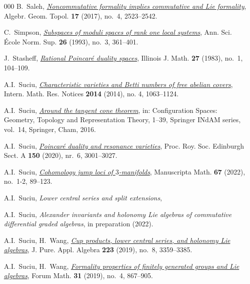 \documentclass{article}
\numberwithin{equation}{section}
\theoremstyle{definition}
\begin{document}
\begin{thebibliography}{000}
 B.~Saleh, 
\href{https://dx.doi.org/10.2140/agt.2017.17.2523}%
{\em Noncommutative formality implies commutative and Lie formality}, 
Algebr. Geom. Topol. \textbf{17} (2017), no.~4, 2523--2542. 

  C.~Simpson, 
\href{https://dx.doi.org/https://doi.org/10.24033/asens.1675}%
{\em Subspaces of moduli spaces of rank one local systems}, 
Ann. Sci. \'{E}cole Norm. Sup. \textbf{26} (1993), no.~3, 361--401.

 J.~Stasheff, 
\href{https://dx.doi.org/10.1215/ijm/1256065414}%
{\em Rational Poincar\'e duality spaces}, 
Illinois J. Math. \textbf{27} (1983), no.~1, 104--109.

 A.I.~Suciu,
\href{https://dx.doi.org/10.1093/imrn/rns246}%
{\em Characteristic varieties and Betti numbers of free
abelian covers}, Intern. Math. Res. Notices \textbf{2014} 
(2014), no. 4, 1063--1124.

 A.I.~Suciu,
\href{http://dx.doi.org/10.1007/978-3-319-31580-5_1}%
{\em Around the tangent cone theorem}, in: 
Configuration Spaces: Geometry, Topology and Representation Theory, 
1--39, Springer INdAM series, vol.~14, Springer, Cham, 2016.

 A.I.~Suciu,
\href{https://doi.org/10.1017/prm.2019.55}%
{\em Poincar\'{e} duality and resonance varieties}, 
Proc. Roy. Soc. Edinburgh Sect. A
\textbf{150} (2020), nr.~6, 3001--3027. 

 A.I.~Suciu,
\href{https://doi.org/10.1007/s00229-020-01264-5}%
{\em Cohomology jump loci of $3$-manifolds}, 
Man\-uscripta Math. \textbf{67} (2022), no.~1-2, 89--123.

 A.I.~Suciu,
{\em Lower central series and split extensions},  

 A.I.~Suciu,
{\em Alexander invariants and holonomy Lie algebras of 
commutative differential graded algebras}, in preparation (2022).

 A.I.~Suciu, H.~Wang, 
\href{http://dx.doi.org/10.1016/j.jpaa.2018.11.006}%
{\em Cup products, lower central series, and holonomy Lie algebras}, 
J. Pure. Appl. Algebra \textbf{223} (2019), no.~8, 3359--3385.

 A.I.~Suciu, H.~Wang, 
\href{https://doi.org/10.1515/forum-2018-0098}%
{\em Formality properties of finitely generated groups and Lie 
algebras}, Forum Math. \textbf{31} (2019), no.~4, 867--905. 


\end{thebibliography}
\end{document}
